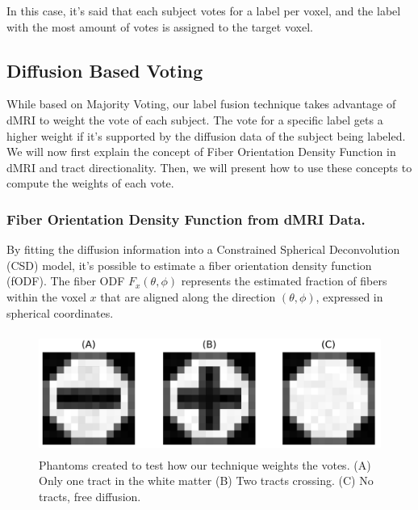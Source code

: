 In this case, it's said that each subject votes for a label
per voxel, and the label with the most amount of votes is assigned to the target
voxel.

\subsection{Diffusion Based Voting}
While based on Majority Voting, our label fusion technique takes advantage of
dMRI to weight the vote of each subject. The vote for a specific label gets a
higher weight if it's supported by the diffusion data of the subject being
labeled. We will now first explain the concept of Fiber Orientation Density Function
in dMRI and tract directionality. Then, we will present how to use these concepts to
compute the weights of each vote.

\subsubsection{Fiber Orientation Density Function from dMRI Data.}
By fitting the diffusion information into a Constrained Spherical Deconvolution (CSD)
model, it's possible to estimate a fiber orientation density function\cite{Tournier2004} (fODF). 
The fiber ODF $F_x(\theta, \phi)$ represents the estimated fraction of fibers
within the voxel $x$ that are aligned along the direction $(\theta, \phi)$,
expressed in spherical coordinates.

\begin{figure}[t!]
    \includegraphics[height=150px]{7.multiatlas/img/phantoms.png}
    \caption{Phantoms created to test how our technique weights the votes.
             (A) Only one tract in the white matter (B) Two tracts crossing. (C) No tracts, free diffusion.}
    \label{fig:pha_exp_1}
\end{figure}

